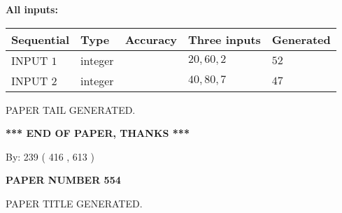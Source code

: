 \documentclass[12pt]{article}
\begin{document}
   
\noindent\vspace{0.1in}\hspace{-0.08in} {\textbf{\Large{All inputs: }}}
   
   
  
  
\noindent\begin{tabular}{|l|l|l|l|l|}
\hline
 Sequential & Type & Accuracy & Three inputs & Generated \\ 
\hline
 
 
  INPUT $  1 $ & integer &  & $
 20
 , 
 60
 , 
 2
 $ & $ 52 $ 
 \\  \hline  
 
 
  INPUT $  2 $ & integer &  & $
 40
 , 
 80
 , 
 7
 $ & $ 47 $ 
 \\  \hline  
 \end{tabular}
   
   
   
   
   
   
 \vspace{0.2in}
 
   
   
\vspace{2.0in} PAPER TAIL GENERATED.
   
   
   
   
\vspace{1.0in} 
{\textbf{\large{ *** END OF PAPER, THANKS *** }}} 
   
   
\hspace{1.0in} By: 
 239 ( 416 ,  613 )
   
   
   
   
\newpage 
\setcounter{page}{ 
   554001 } 
   
   
   
   
 {\textbf{ \Large{ PAPER NUMBER  554  }}}
   
   
\vspace{0.2in}
   
   
   
   
   
   
   
   
 \vspace{0.2in}
 
 
 
 
   
   
 PAPER TITLE GENERATED.
   
   
   
\vspace{0.2in}
   
\end{document}
